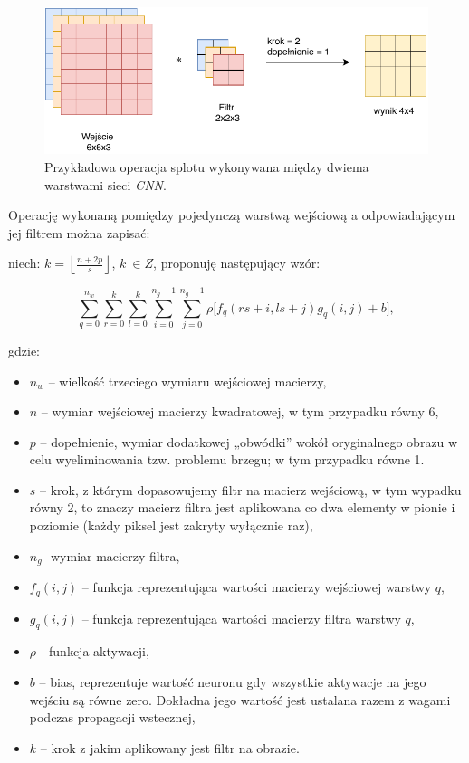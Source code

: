 \begin{figure}[ht]
\centerline{\includegraphics[scale=0.8]{resources/cnn/splot_w_cnn.pdf}}
\caption{Przykładowa operacja splotu wykonywana między dwiema warstwami sieci \textit{CNN}.}
\label{fig:splot}
\end{figure}

Operację wykonaną pomiędzy pojedynczą warstwą wejściową a odpowiadającym jej filtrem można zapisać:

niech: \(k = \left\lfloor \frac{n + 2p}{s} \right\rfloor\), \(k\ \in Z\), proponuję następujący wzór:

\[\sum_{q = 0}^{n_{w}}{\sum_{r = 0}^{k}{\sum_{l = 0}^{k}\sum_{i = 0}^{n_{g} - 1}{\sum_{j = 0}^{n_{g} - 1}{\rho\lbrack f_{q}\left( rs + i,ls + j \right) g_{q}\left( i,j \right) + b\rbrack}}}}, \tag{9}\]

gdzie:

\begin{itemize}
\item
  \(n_{w}\) -- wielkość trzeciego wymiaru wejściowej macierzy,
\item
  \(n\) -- wymiar wejściowej macierzy kwadratowej, w tym przypadku równy 6,
\item
  \(p\) -- dopełnienie, wymiar dodatkowej „obwódki'' wokół oryginalnego
  obrazu w celu wyeliminowania tzw. problemu brzegu; w tym przypadku
  równe 1.
\item
  \(s\) -- krok, z którym dopasowujemy filtr na macierz wejściową, w tym
  wypadku równy 2, to znaczy macierz filtra jest aplikowana co dwa
  elementy w pionie i poziomie (każdy piksel jest zakryty wyłącznie
  raz),
\item
  \(n_{g}\)- wymiar macierzy filtra,
\item
  \(f_{q}(i,j)\) -- funkcja reprezentująca wartości macierzy wejściowej
  warstwy \(q\),
\item
  \(g_{q}(i,j)\) -- funkcja reprezentująca wartości macierzy filtra
  warstwy \(q\),
\item
  \(\rho\) - funkcja aktywacji,
\item
  \(b\) -- bias, reprezentuje wartość neuronu gdy wszystkie aktywacje na jego wejściu są równe zero. Dokładna jego wartość jest ustalana razem z wagami podczas propagacji wstecznej,
\item
  \(k\) -- krok z jakim aplikowany jest filtr na obrazie.
\end{itemize}

